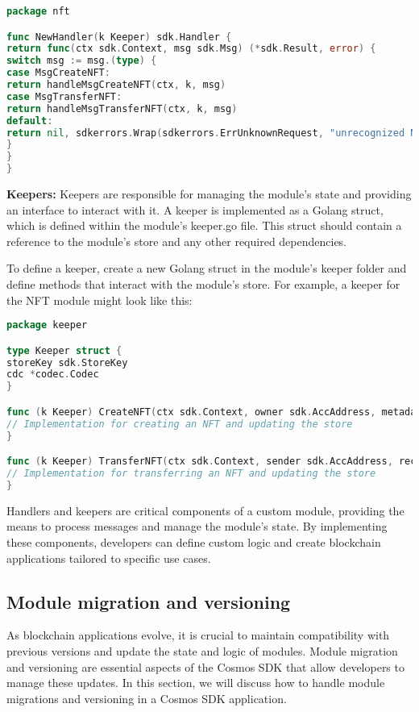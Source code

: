 \documentclass{article}
\begin{document}
\begin{lstlisting}[language=Go]
package nft

func NewHandler(k Keeper) sdk.Handler {
return func(ctx sdk.Context, msg sdk.Msg) (*sdk.Result, error) {
switch msg := msg.(type) {
case MsgCreateNFT:
return handleMsgCreateNFT(ctx, k, msg)
case MsgTransferNFT:
return handleMsgTransferNFT(ctx, k, msg)
default:
return nil, sdkerrors.Wrap(sdkerrors.ErrUnknownRequest, "unrecognized NFT message type")
}
}
}
\end{lstlisting}

\textbf{Keepers:} Keepers are responsible for managing the module's state and providing an interface to interact with it. A keeper is implemented as a Golang struct, which is defined within the module's keeper.go file. This struct should contain a reference to the module's store and any other required dependencies.

To define a keeper, create a new Golang struct in the module's keeper folder and define methods that interact with the module's store. For example, a keeper for the NFT module might look like this:

\begin{lstlisting}[language=Go]
package keeper

type Keeper struct {
storeKey sdk.StoreKey
cdc *codec.Codec
}

func (k Keeper) CreateNFT(ctx sdk.Context, owner sdk.AccAddress, metadata string) (string, error) {
// Implementation for creating an NFT and updating the store
}

func (k Keeper) TransferNFT(ctx sdk.Context, sender sdk.AccAddress, recipient sdk.AccAddress, nftID string) error {
// Implementation for transferring an NFT and updating the store
}
\end{lstlisting}

Handlers and keepers are critical components of a custom module, providing the means to process messages and manage the module's state. By implementing these components, developers can define custom logic and create blockchain applications tailored to specific use cases.
%
\subsection{Module migration and versioning}

As blockchain applications evolve, it is crucial to maintain compatibility with previous versions and update the state and logic of modules. Module migration and versioning are essential aspects of the Cosmos SDK that allow developers to manage these updates. In this section, we will discuss how to handle module migrations and versioning in a Cosmos SDK application.
\end{document}
